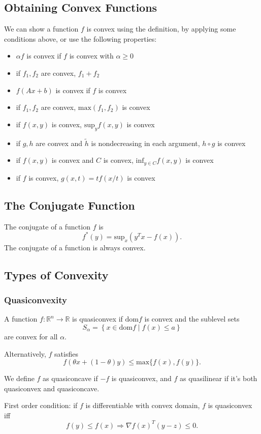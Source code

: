 \documentclass[11pt]{article}
\begin{document}
\subsection{Obtaining Convex Functions} 
We can show a function $f$ is convex using the definition, by applying some conditions above, or use the following properties: 
\begin{itemize}
    \item $\alpha f$ is convex if $f$ is convex with $\alpha \geq 0$ 
    \item if $f_1, f_2$ are convex, $f_1 + f_2$
    \item $f(Ax+b)$ is convex if $f$ is convex
    \item if $f_1, f_2$ are convex, $\mathrm{max}(f_1, f_2)$ is convex
    \item if $f(x, y)$ is convex, $\mathrm{sup}_y f(x, y)$ is convex
    \item if $g, h$ are convex and $\tilde{h}$ is nondecreasing in each argument, $h \circ g$ is convex
    \item if $f(x, y)$ is convex and $C$ is convex, $\mathrm{inf}_{y \in C} f(x, y)$ is convex
    \item if $f$ is convex, $g(x, t) = tf(x/t)$ is convex
\end{itemize}

\subsection{The Conjugate Function} 
The conjugate of a function $f$ is 
\[ f^*(y) = \mathrm{sup}_x (y^Tx - f(x)). \] 
The conjugate of a function is always convex. 

\subsection{Types of Convexity} 
\subsubsection*{Quasiconvexity} 
A function $f: \mathbb{R}^n \rightarrow \mathbb{R}$ is quasiconvex if $\mathrm{dom}f$ is convex and the sublevel sets 
\[ S_\alpha = \left\{ x \in \mathrm{dom}f \mid f(x) \leq a \right\} \] 
are convex for all $\alpha$. \par 
Alternatively, $f$ satisfies 
\[ f(\theta x + (1-\theta)y) \leq \mathrm{max}\{ f(x), f(y) \}. \] 

We define $f$ as quasiconcave if $-f$ is quasiconvex, and $f$ as quasilinear if it's both quasiconvex and quasiconcave. \par 
First order condition: if $f$ is differentiable with convex domain, $f$ is quasiconvex iff 
\[ f(y) \leq f(x) \Rightarrow \nabla f(x)^T(y-z) \leq 0. \] 
\end{document}
